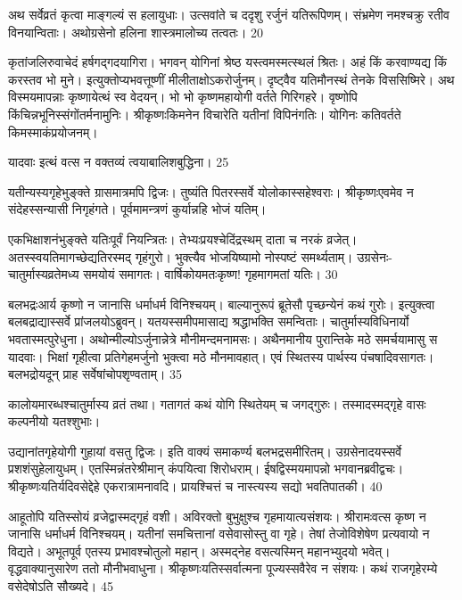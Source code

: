 अथ सर्वेव्रतं कृत्वा माङ्गल्यं स हलायुधाः।
 उत्सवांते च ददृशु रर्जुनं यतिरूपिणम्।
 संभ्रमेण नमश्चक्रु रतीव विनयान्विताः।
 अथोग्रसेनो हलिना शास्त्रमालोच्य तत्वतः।
 20

  कृतांजलिरुवाचेदं हर्षगद्गदयागिरा।
 भगवन् योगिनां श्रेष्ठ यस्त्वमस्मत्स्थलं श्रितः।
 अहं किं करवाण्यद्य किं करस्तव भो मुने।
 इत्युक्तोप्यभवत्तूष्णीं मीलीताक्षोऽकरोर्जुनम्।
 दृष्ट्वैव यतिमौनस्थं तेनके विससिष्मिरे।
 अथ विस्मयमापन्नाः कृष्णायेत्थं स्व वेदयन्।
 भो भो कृष्णमहायोगी वर्तते गिरिगहरे।
 वृष्णोपि किंचिन्नभूनिस्संगोंतर्मनामुनिः।
 श्रीकृष्णःकिमनेन विचारेति यतीनां विपिनंगतिः।
 योगिनः कतिवर्तते किमस्माकंप्रयोजनम्।
 
यादवाः
इत्थं वत्स न वक्तव्यं त्वयाबालिशबुद्धिना।
 25

  यतीन्यस्यगृहेभुङ्क्ते ग्रासमात्रमपि द्विजः।
 तुष्यंति पितरस्सर्वे योलोकास्सहेश्वराः।
 श्रीकृष्णःएवमेव न संदेहस्सन्यासी निगृहंगते।
 पूर्वमामन्त्रणं कुर्यान्नहि भोजं यतिम्।
 
एकभिक्षाशनंभुङ्क्ते यतिःपूर्वं नियन्त्रितः।
 तेभ्यःप्रयश्चेदिंद्रस्थम् दाता च नरकं व्रजेत्।
 अतस्स्वयतिमागच्छेद्यतिरस्मद् गृहंगुरो।
 भुक्त्यैव भोजयिष्यामो नोस्पष्टं समर्थ्यताम्।
 उग्रसेनः- चातुर्मास्यव्रतेमध्य समयोयं समागतः।
 वार्षिकोयमतःकृष्ण! गृहमागमतां यतिः।
 30

  बलभद्रःआर्य कृष्णो न जानासि धर्माधर्म विनिश्चयम्।
 बाल्यानुरूपं ब्रूतेसौ पृच्छन्येनं कथं गुरोः।
 इत्युक्त्वा बलबद्राद्यास्सर्वे प्रांजलयोऽब्रुवन्।
 यतयस्समीपमासाद्य श्रद्धाभक्ति समन्विताः।
 चातुर्मास्यविधिनार्यो भवतास्मत्पुरेधुना।
 अथोन्मील्योऽर्जुनान्नेत्रे मौनीमन्दमनामसः।
 अथैनमानीय पुरान्तिके मठे समर्चयामासु स यादवाः।
 भिक्षां गृहीत्वा प्रतिगेहमर्जुनो भुक्त्वा मठे मौनमावहात्।
 एवं स्थितस्य पार्थस्य पंचषादिवसागतः।
 बलभद्रोयदून् प्राह सर्वेषांचोपशृण्वताम्।
 35

  कालोयमारब्धश्चातुर्मास्य व्रतं तथा।
 गतागतं कथं योगि स्थितेयम् च जगद्गुरुः।
 तस्मादस्मद्गृहे वासः कल्पनीयो यतश्शुभाः।
 
उद्यानांतगृहेयोगी गुहायां वसतु द्विजः।
 इति वाक्यं समाकर्ण्य बलभद्रसमीरितम्।
 उग्रसेनादयस्सर्वे प्रशशंसुहेलायुधम्।
 एतस्मिन्नंतरेश्रीमान् कंपयित्वा शिरोधराम्।
 ईषद्विस्मयमापन्नो भगवानब्रवीद्वचः।
 श्रीकृष्णःयतिर्यदिवसेद्देहे एकरात्रामनावदि।
 प्रायश्चित्तं च नास्त्यस्य सद्यो भवतिपातकी।
 40

  आहूतोपि यतिस्सोयं व्रजेद्वास्मद्गृहं वशी।
 अविरक्तो बुभुक्षुश्च गृहमायात्यसंशयः।
 श्रीरामःवत्स कृष्ण न जानासि धर्माधर्म विनिश्चयम्।
 यतीनां समचित्तानां वसेवासोस्तु वा गृहे।
 तेषां तेजोविशेषेण प्रत्यवायो न विद्यते।
 अभूतपूर्व एतस्य प्रभावश्चोतुलो महान्।
 अस्मद्नेह वसत्यस्मिन् महानभ्युदयो भवेत्।
 वृद्धवाक्यानुसारेण ततो मौनीभवाधुना।
 श्रीकृष्णःयतिस्सर्वात्मना पूज्यस्सवैरेव न संशयः।
 कथं राजगृहेरम्ये वसेदेषोऽति सौख्यदे।
 45

